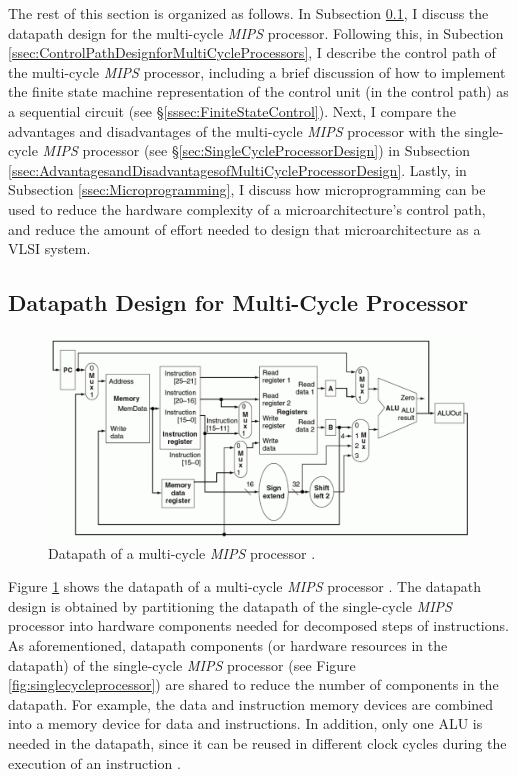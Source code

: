 The rest of this section is organized as follows. In Subsection \ref{ssec:DatapathDesignforMultiCycleProcessors}, I discuss the datapath design for the multi-cycle {\it MIPS} processor. Following this, in Subection \ref{ssec:ControlPathDesignforMultiCycleProcessors}, I describe the control path of the multi-cycle {\it MIPS} processor, including a brief discussion of how to implement the finite state machine representation of the control unit (in the control path) as a sequential circuit (see \S\ref{sssec:FiniteStateControl}). Next, I compare the advantages and disadvantages of the multi-cycle {\it MIPS} processor with the single-cycle {\it MIPS} processor (see \S\ref{sec:SingleCycleProcessorDesign}) in Subsection \ref{ssec:AdvantagesandDisadvantagesofMultiCycleProcessorDesign}. Lastly, in Subsection \ref{ssec:Microprogramming}, I discuss how microprogramming can be used to reduce the hardware complexity of a microarchitecture's control path, and reduce the amount of effort needed to design that microarchitecture as a VLSI system.



\subsection{Datapath Design for Multi-Cycle Processor}
\label{ssec:DatapathDesignforMultiCycleProcessors}

\begin{figure}[h]
\centering 
\includegraphics[width=6in]{./pics/multi-cycle-processor-data-path2}
\caption{Datapath of a multi-cycle {\it MIPS} processor \cite{Patterson2005}.}
\label{fig:multicycleprocessordatapath2}
\end{figure}


Figure \ref{fig:multicycleprocessordatapath2} shows the datapath of a multi-cycle {\it MIPS} processor \cite{Patterson2005}. The datapath design is obtained by partitioning the datapath of the single-cycle {\it MIPS} processor into hardware components needed for decomposed steps of instructions. As aforementioned, datapath components (or hardware resources in the datapath) of the single-cycle {\it MIPS} processor (see Figure \ref{fig:singlecycleprocessor}) are shared to reduce the number of components in the datapath. For example, the data and instruction memory devices are combined into a memory device for data and instructions. In addition, only one ALU is needed in the datapath, since it can be reused in different clock cycles during the execution of an instruction \cite{Patterson2005}. \\

